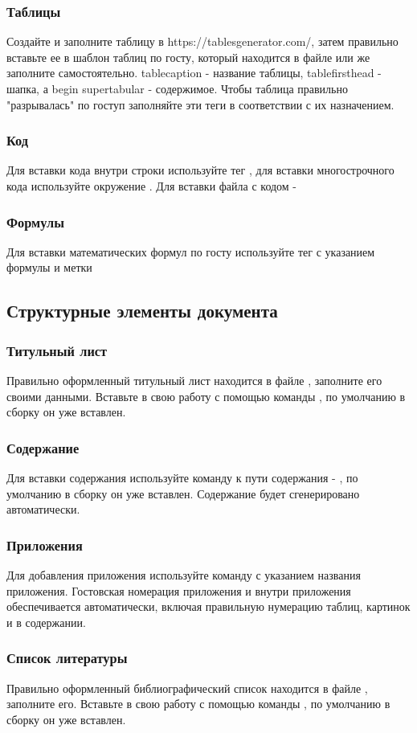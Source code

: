 \subsubsection{Таблицы}
Создайте и заполните таблицу в https://tablesgenerator.com/, затем правильно вставьте ее в шаблон таблиц по госту, который находится в файле  или же заполните самостоятельно. tablecaption - название таблицы, tablefirsthead - шапка, а begin supertabular - содержимое. Чтобы таблица правильно "разрывалась" по гоступ заполняйте эти теги в соответствии с их назначением.
\subsubsection{Код}
Для вставки кода внутри строки используйте тег , для вставки многострочного кода используйте окружение . Для вставки файла с кодом - 
\subsubsection{Формулы}
Для вставки математических формул по госту используйте тег  с указанием формулы и метки
\subsection{Структурные элементы документа}
\subsubsection{Титульный лист}
Правильно оформленный титульный лист находится в файле , заполните его своими данными. Вставьте в свою работу с помощью команды , по умолчанию в сборку он уже вставлен.
\subsubsection{Содержание}
Для вставки содержания используйте команду  к пути содержания - , по умолчанию в сборку он уже вставлен. Содержание будет сгенерировано автоматически.
\subsubsection{Приложения}
Для добавления приложения используйте команду  с указанием названия приложения. Гостовская номерация приложения и внутри приложения обеспечивается автоматически, включая правильную нумерацию таблиц, картинок и в содержании.
\subsubsection{Список литературы}
Правильно оформленный библиографический список находится в файле , заполните его. Вставьте в свою работу с помощью команды , по умолчанию в сборку он уже вставлен.
